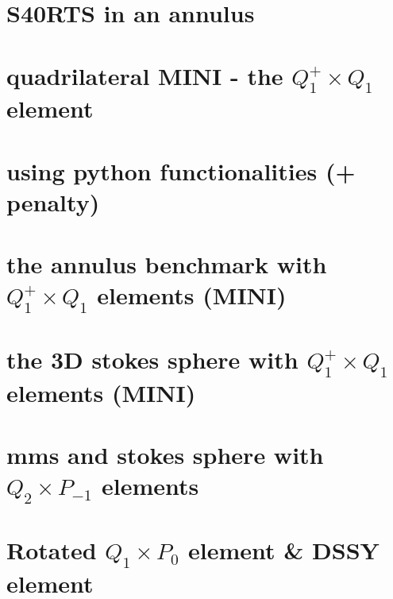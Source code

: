 \documentclass[a4paper,11pt]{report}
\begin{document}
\chapter{S40RTS in an annulus \label{f71}} %

\chapter{quadrilateral MINI - the $Q_1^+\times Q_1$ element \label{f72}} %

\chapter{using python functionalities (\QonePzero + penalty)\label{f73}} %

\chapter{the annulus benchmark with $Q_1^+\times Q_1$ elements (MINI) \label{f74}} %

\chapter{the 3D stokes sphere with $Q_1^{+}\times Q_1$ elements (MINI) \label{f75}} %

\chapter{mms and stokes sphere with $Q_2\times P_{-1}$ elements \label{f76}} %

\chapter{Rotated $Q_1\times P_0$ element \& DSSY element \label{f77}} %
\end{document}

